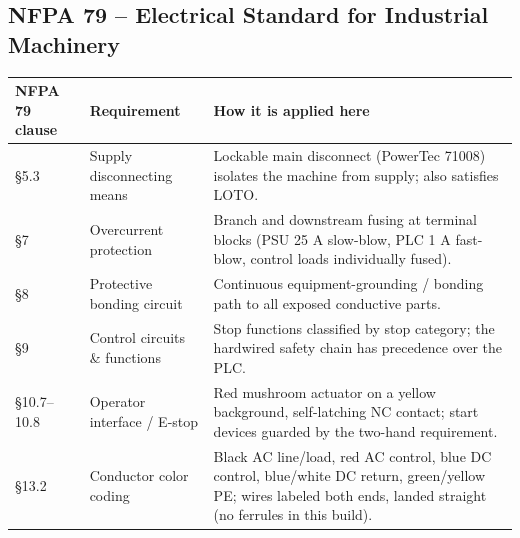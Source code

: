 \documentclass[hidelinks,12pt]{article}
\begin{document}
\subsection{NFPA 79 -- Electrical Standard for Industrial Machinery}
\label{subsec:nfpa79}
\renewcommand{\arraystretch}{1.3}
\noindent\begin{tabularx}{\textwidth}{|p{2.5cm}|p{3.0cm}|X|}
\hline
\rowcolor{PSUgreen!12}\textbf{NFPA 79 clause} & \textbf{Requirement} & \textbf{How it is applied here} \\
\hline
\S5.3 & Supply disconnecting means & Lockable main disconnect (PowerTec 71008) isolates the machine from supply; also satisfies LOTO. \\ \hline
\S7 & Overcurrent protection & Branch and downstream fusing at terminal blocks (PSU 25 A slow-blow, PLC 1 A fast-blow, control loads individually fused). \\ \hline
\S8 & Protective bonding circuit & Continuous equipment-grounding / bonding path to all exposed conductive parts. \\ \hline
\S9 & Control circuits \& functions & Stop functions classified by stop category; the hardwired safety chain has precedence over the PLC. \\ \hline
\S10.7--10.8 & Operator interface / E-stop & Red mushroom actuator on a yellow background, self-latching NC contact; start devices guarded by the two-hand requirement. \\ \hline
\S13.2 & Conductor color coding & Black AC line/load, red AC control, blue DC control, blue/white DC return, green/yellow PE; wires labeled both ends, landed straight (no ferrules in this build). \\
\hline
\end{tabularx}
\renewcommand{\arraystretch}{1.0}
\end{document}
